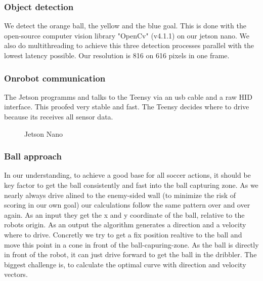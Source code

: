 \documentclass{scrartcl}
\begin{document}
\subsubsection{Object detection}
We detect the orange ball, the yellow and the blue goal. This is done with the open-source computer vision library "OpenCv" (v4.1.1)
on our jetson nano. We also do multithreading to achieve this three detection processes parallel with the lowest latency possible.
Our resolution is 816 on 616 pixels in one frame.
\subsubsection{Onrobot communication}
The Jetson programms and talks to the Teensy via an usb cable and a raw HID interface. This proofed very stable and fast. The Teensy decides where
to drive because its receives all sensor data.

\begin{figure}[!h]
    \begin{center}
    \caption{Jetson Nano}
    \label{jetson}
    \end{center}
    \end{figure}

\newpage

\subsubsection{Ball approach}
In our understanding, to achieve a good base for all soccer actions, it should be key factor to get the ball
consistently and fast into the ball capturing zone.
As we nearly always drive alined to the enemy-sided wall (to minimize the risk of scoring in our own goal) our
calculations follow the same pattern over and over again. As an input they get the x and y coordinate of the
ball, relative to the robots origin. As an output the algorithm generates a direction and a velocity where to drive.
Concretly we try to get a fix position realtive to the ball and move this point in a cone in front of the ball-capuring-zone.
As the ball is directly in front of the robot, it can just drive forward to get the ball in the dribbler. The biggest challenge is,
to calculate the optimal curve with direction and velocity vectors.
\end{document}
